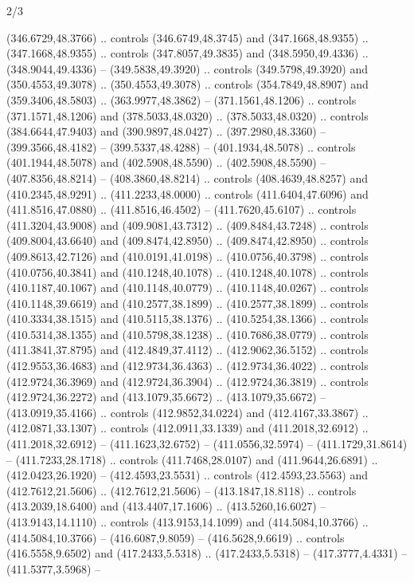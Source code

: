 \begin{flagdescription}{2/3}
\begin{scope}[xshift=0.5\flaglength,yshift=0.5\flagwidth,scale=\flagwidth/525.28]
\begin{scope}[y=0.1mm, x=0.1mm, yscale=-1,shift={(-381.5,-404)}]
\begin{scope}[shift={(5.25001,4.53053)},miter limit=4.00,line width=0.800\lw]
  (346.6729,48.3766) .. controls (346.6749,48.3745) and (347.1668,48.9355) ..
  (347.1668,48.9355) .. controls (347.8057,49.3835) and (348.5950,49.4336) ..
  (348.9044,49.4336) -- (349.5838,49.3920) .. controls (349.5798,49.3920) and
  (350.4553,49.3078) .. (350.4553,49.3078) .. controls (354.7849,48.8907) and
  (359.3406,48.5803) .. (363.9977,48.3862) -- (371.1561,48.1206) .. controls
  (371.1571,48.1206) and (378.5033,48.0320) .. (378.5033,48.0320) .. controls
  (384.6644,47.9403) and (390.9897,48.0427) .. (397.2980,48.3360) --
  (399.3566,48.4182) -- (399.5337,48.4288) -- (401.1934,48.5078) .. controls
  (401.1944,48.5078) and (402.5908,48.5590) .. (402.5908,48.5590) --
  (407.8356,48.8214) -- (408.3860,48.8214) .. controls (408.4639,48.8257) and
  (410.2345,48.9291) .. (411.2233,48.0000) .. controls (411.6404,47.6096) and
  (411.8516,47.0880) .. (411.8516,46.4502) -- (411.7620,45.6107) .. controls
  (411.3204,43.9008) and (409.9081,43.7312) .. (409.8484,43.7248) .. controls
  (409.8004,43.6640) and (409.8474,42.8950) .. (409.8474,42.8950) .. controls
  (409.8613,42.7126) and (410.0191,41.0198) .. (410.0756,40.3798) .. controls
  (410.0756,40.3841) and (410.1248,40.1078) .. (410.1248,40.1078) .. controls
  (410.1187,40.1067) and (410.1148,40.0779) .. (410.1148,40.0267) .. controls
  (410.1148,39.6619) and (410.2577,38.1899) .. (410.2577,38.1899) .. controls
  (410.3334,38.1515) and (410.5115,38.1376) .. (410.5254,38.1366) .. controls
  (410.5314,38.1355) and (410.5798,38.1238) .. (410.7686,38.0779) .. controls
  (411.3841,37.8795) and (412.4849,37.4112) .. (412.9062,36.5152) .. controls
  (412.9553,36.4683) and (412.9734,36.4363) .. (412.9734,36.4022) .. controls
  (412.9724,36.3969) and (412.9724,36.3904) .. (412.9724,36.3819) .. controls
  (412.9724,36.2272) and (413.1079,35.6672) .. (413.1079,35.6672) --
  (413.0919,35.4166) .. controls (412.9852,34.0224) and (412.4167,33.3867) ..
  (412.0871,33.1307) .. controls (412.0911,33.1339) and (411.2018,32.6912) ..
  (411.2018,32.6912) -- (411.1623,32.6752) -- (411.0556,32.5974) --
  (411.1729,31.8614) -- (411.7233,28.1718) .. controls (411.7468,28.0107) and
  (411.9644,26.6891) .. (412.0423,26.1920) -- (412.4593,23.5531) .. controls
  (412.4593,23.5563) and (412.7612,21.5606) .. (412.7612,21.5606) --
  (413.1847,18.8118) .. controls (413.2039,18.6400) and (413.4407,17.1606) ..
  (413.5260,16.6027) -- (413.9143,14.1110) .. controls (413.9153,14.1099) and
  (414.5084,10.3766) .. (414.5084,10.3766) -- (416.6087,9.8059) --
  (416.5628,9.6619) .. controls (416.5558,9.6502) and (417.2433,5.5318) ..
  (417.2433,5.5318) -- (417.3777,4.4331) -- (411.5377,3.5968) --

\end{scope}
\end{scope}
\end{scope}
\end{flagdescription}
